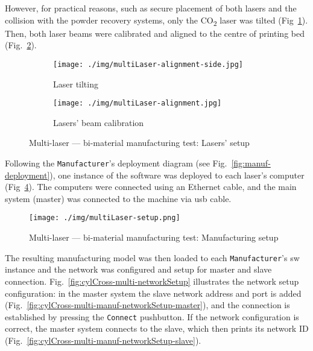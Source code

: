 However, for practical reasons, such as secure placement of both lasers and the
collision with the powder recovery systems, only the CO\textsubscript{2} laser
was tilted (Fig~\ref{fig:multiLaser-setup-1}). Then, both laser beams were
calibrated and aligned to the centre of printing bed (Fig.~\ref{fig:multiLaser-setup-2}).

\begin{figure}[htbp!]
%
  \centering
  \begin{subfigure}[t]{0.48\textwidth}
    \centering
  \texttt{[image: ./img/multiLaser-alignment-side.jpg]}
  \caption{Laser tilting}%
  \label{fig:multiLaser-setup-1}
\end{subfigure}
  \begin{subfigure}[t]{.48\textwidth}
  \centering
    \texttt{[image: ./img/multiLaser-alignment.jpg]}
  \caption{Lasers' beam calibration}%
  \label{fig:multiLaser-setup-2}
  \end{subfigure}
  \caption{Multi-laser --- bi-material manufacturing test: Lasers' setup}%
  \label{fig:multiLaser-setup}
\end{figure}

Following the \texttt{Manufacturer}'s deployment diagram (see
Fig.~\ref{fig:manuf-deployment}), one instance of the software was deployed to
each laser's computer (Fig~\ref{fig:multiLaser-setup-annotated}). The computers were connected using an Ethernet cable, and
the main system (master) was connected to the machine via \gls{usb} cable. 

\begin{figure}[htbp!]
%
  \centering
    \texttt{[image: ./img/multiLaser-setup.png]}
  \caption{Multi-laser --- bi-material manufacturing test: Manufacturing setup}%
  \label{fig:multiLaser-setup-annotated}
\end{figure}

The resulting manufacturing model was then loaded to each
\texttt{Manufacturer}'s \gls{sw} instance and the network was configured and
setup for master
and slave connection. Fig.~\ref{fig:cylCross-multi-networkSetup}
illustrates the network setup configuration: in the master system the slave
network address and port is added
(Fig.~\ref{fig:cylCross-multi-manuf-networkSetup-master}), and the connection is
established by pressing
the \texttt{Connect} pushbutton. If the network configuration is correct, the
master system connects to the slave, which then prints its network ID (Fig.~\ref{fig:cylCross-multi-manuf-networkSetup-slave}).

